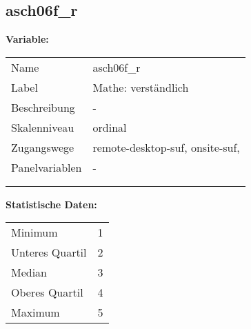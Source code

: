 	
	
	\subsection{asch06f\_r}
	\label{subSection:asch06f_r}

	\noindent\textbf{Variable:}\\
		\begin{tabular}{lL{11.3cm}}
			\label{tableVariable:asch06f_r}
			Name & asch06f\_r \\
			Label & Mathe: verständlich \\
			Beschreibung & - \\
			Skalenniveau & ordinal \\
			Zugangswege &
				remote-desktop-suf,
				onsite-suf,
 \\
			Panelvariablen & -
			 \\
			 \\
 \\
		\end{tabular}



		\vspace*{1 cm}
		\noindent\textbf{Statistische Daten:}\\
			\begin{tabular}{ll}
				\label{tableStatistics:asch06f_r}
					Minimum & 1 \\
					Unteres Quartil & 2 \\
					Median & 3 \\
					Oberes Quartil & 4 \\
					Maximum & 5 \\
			\end{tabular}



